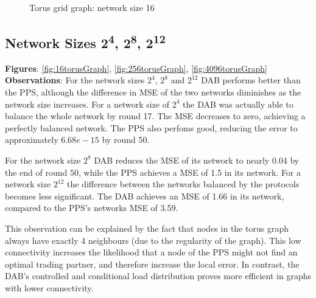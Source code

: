 \begin{figure}[H]
    \centering
    \scalebox{1.5}{}
    \caption{Torus grid graph: network size 16}
    \label{fig:torusGraph}
\end{figure}

\subsection{Network Sizes 2\textsuperscript{4}, 2\textsuperscript{8}, 2\textsuperscript{12}}
\textbf{Figures}: \ref{fig:16torusGraph}, \ref{fig:256torusGraph}, \ref{fig:4096torusGraph}\\
\textbf{Observations}: For the network sizes $2^{4}$, $2^{8}$ and $2^{12}$ DAB performs better than the PPS, although the difference in MSE of the two networks diminishes as the network size increases. For a network size of $2^{4}$ the DAB was actually able to balance the whole network by round 17. The MSE decreases to zero, achieving a perfectly balanced network. The PPS also perfoms good, reducing the error to approximately $6.68e-15$ by round 50.

For the network size $2^{8}$ DAB reduces the MSE of its network to nearly 0.04 by the end of round 50, while the PPS achieves a MSE of 1.5 in its network. For a network size $2^{12}$ the difference between the networks balanced by the protocols becomes less significant. The DAB achieves an MSE of 1.66 in its network, compared to the PPS's networks MSE of 3.59.

This observation can be explained by the fact that nodes in the torus graph always have exactly 4 neighbours (due to the regularity of the graph). This low connectivity increases the likelihood that a node of the PPS might not find an optimal trading partner, and therefore increase the local error. In contrast, the DAB's controlled and conditional load distribution proves more efficient in graphs with lower connectivity.

